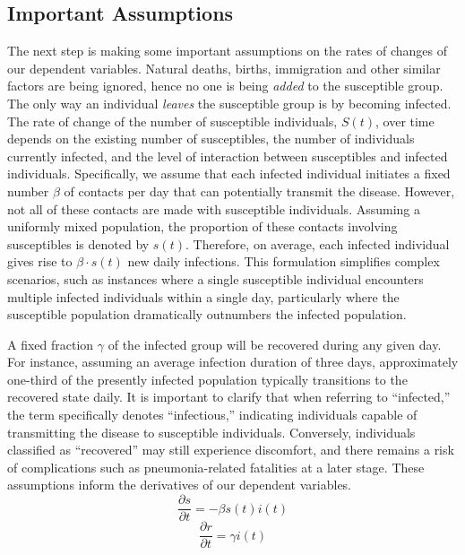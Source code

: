 \subsection{Important Assumptions}
\hspace{\parindent}The next step is making some important assumptions on the rates of changes of our dependent variables.
Natural deaths, births, immigration and other similar factors are being ignored, hence no one is being \textit{added} to the susceptible group.
The only way an individual \textit{leaves} the susceptible group is by becoming infected.
The rate of change of the number of susceptible individuals, $S(t)$, over time depends on the existing number of susceptibles, the number of individuals currently infected, and the level of interaction between susceptibles and infected individuals.
Specifically, we assume that each infected individual initiates a fixed number $\beta$ of contacts per day that can potentially transmit the disease.
However, not all of these contacts are made with susceptible individuals.
Assuming a uniformly mixed population, the proportion of these contacts involving susceptibles is denoted by $s(t)$.
Therefore, on average, each infected individual gives rise to $\beta \cdot s(t)$ new daily infections.
This formulation simplifies complex scenarios, such as instances where a single susceptible individual encounters multiple infected individuals within a single day, particularly where the susceptible population dramatically outnumbers the infected population.
\par\bigskip
A fixed fraction $\gamma$ of the infected group will be recovered during any given day.
For instance, assuming an average infection duration of three days, approximately one-third of the presently infected population typically transitions to the recovered state daily.
It is important to clarify that when referring to ``infected,'' the term specifically denotes ``infectious,'' indicating individuals capable of transmitting the disease to susceptible individuals.
Conversely, individuals classified as ``recovered'' may still experience discomfort, and there remains a risk of complications such as pneumonia-related fatalities at a later stage.
These assumptions inform the derivatives of our dependent variables.
\begin{equation}
    \frac{\partial s}{\partial t} = -\beta s(t)  i(t)
\end{equation}
\begin{equation}
    \frac{\partial r}{\partial t} = \gamma i(t)
\end{equation}
